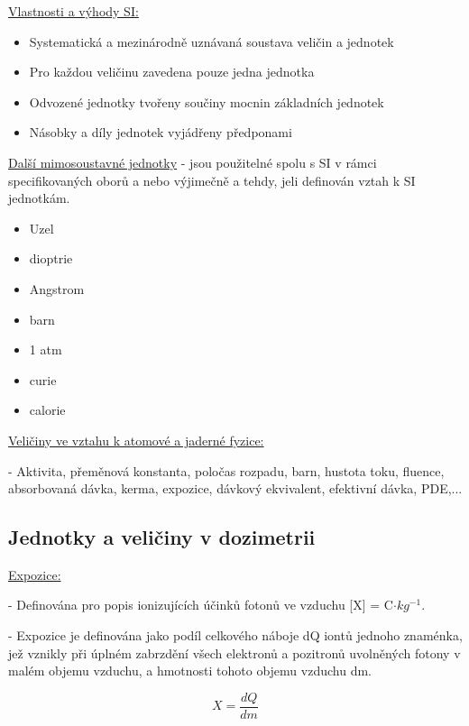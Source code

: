 \underline{Vlastnosti a výhody SI:}
\begin{itemize}
    \item Systematická a mezinárodně uznávaná soustava veličin a jednotek
    \item Pro každou veličinu zavedena pouze jedna jednotka
    \item Odvozené jednotky tvořeny součiny mocnin základních jednotek
    \item Násobky a díly jednotek vyjádřeny předponami
\end{itemize}


\underline{Další mimosoustavné jednotky} - jsou použitelné spolu s SI v rámci specifikovaných oborů a nebo výjimečně a tehdy, jeli definován vztah k SI jednotkám.
\begin{itemize}
    \item Uzel
    \item dioptrie
    \item Angstrom
    \item barn
    \item 1 atm
    \item curie
    \item calorie
\end{itemize}


\underline{Veličiny ve vztahu k atomové a jaderné fyzice:}

- Aktivita, přeměnová konstanta, poločas rozpadu, barn, hustota toku, fluence, absorbovaná dávka, kerma, expozice, dávkový ekvivalent, efektivní dávka, PDE,...

\subsection{Jednotky a veličiny v dozimetrii}

\underline{Expozice:}

- Definována pro popis ionizujících účinků fotonů ve vzduchu [X] = C$\cdot kg^{-1}$.

- Expozice je definována jako podíl celkového náboje dQ iontů jednoho znaménka, jež vznikly při úplném zabrzdění všech elektronů a pozitronů uvolněných fotony v malém objemu vzduchu, a hmotnosti tohoto objemu vzduchu dm.

\begin{center}
    \begin{equation}
        X = \frac{dQ}{dm}
    \end{equation}
\end{center}

